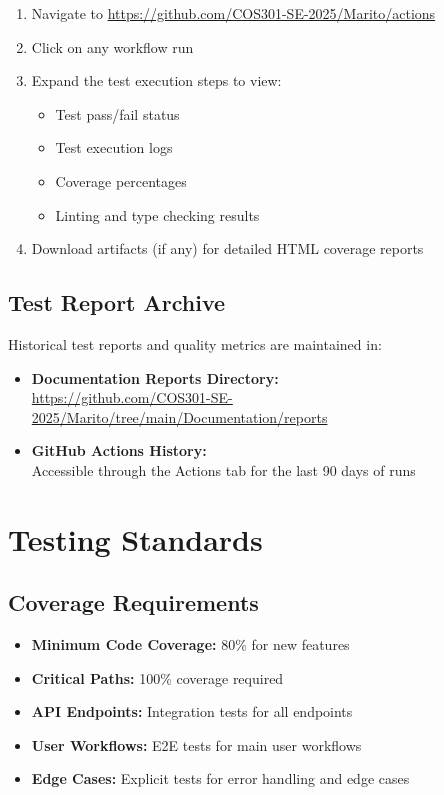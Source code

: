 \documentclass[12pt,a4paper]{article}
\begin{document}
\begin{enumerate}
    \item Navigate to \url{https://github.com/COS301-SE-2025/Marito/actions}
    \item Click on any workflow run
    \item Expand the test execution steps to view:
    \begin{itemize}
        \item Test pass/fail status
        \item Test execution logs
        \item Coverage percentages
        \item Linting and type checking results
    \end{itemize}
    \item Download artifacts (if any) for detailed HTML coverage reports
\end{enumerate}

\subsection{Test Report Archive}

Historical test reports and quality metrics are maintained in:

\begin{itemize}
    \item \textbf{Documentation Reports Directory:} \\
    \url{https://github.com/COS301-SE-2025/Marito/tree/main/Documentation/reports}
    
    \item \textbf{GitHub Actions History:} \\
    Accessible through the Actions tab for the last 90 days of runs
\end{itemize}

\section{Testing Standards}

\subsection{Coverage Requirements}

\begin{itemize}
    \item \textbf{Minimum Code Coverage:} 80\% for new features
    \item \textbf{Critical Paths:} 100\% coverage required
    \item \textbf{API Endpoints:} Integration tests for all endpoints
    \item \textbf{User Workflows:} E2E tests for main user workflows
    \item \textbf{Edge Cases:} Explicit tests for error handling and edge cases
\end{itemize}
\end{document}
